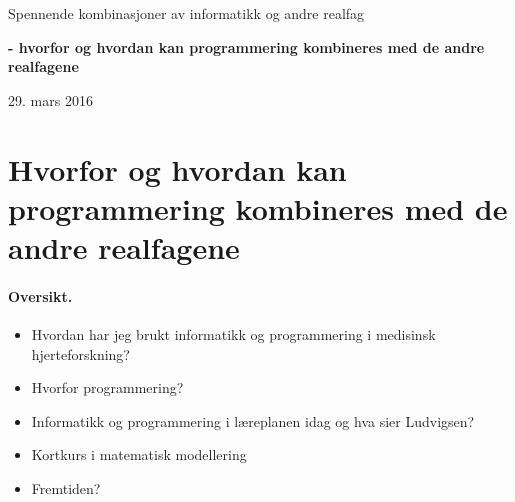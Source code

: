 \documentclass[%
oneside,                 %
final,                   %
10pt,norsk]{article}
\begin{document}






\thispagestyle{empty}

\begin{center}
{\LARGE\bf
\begin{spacing}{1.25}
Spennende kombinasjoner av informatikk og andre realfag
\end{spacing}
}
\end{center}


\begin{center}
{\bf - hvorfor og hvordan kan programmering kombineres med de andre realfagene${}^{}$} \\ [0mm]
\end{center}

\begin{center}
\end{center}
    

\begin{center}
29. mars 2016
\end{center}

\vspace{1cm}



\section*{Hvorfor og hvordan kan programmering kombineres med de andre realfagene}

\paragraph{Oversikt.}
\begin{itemize}
\item Hvordan har jeg brukt informatikk og programmering i medisinsk hjerteforskning?

\item Hvorfor programmering?

\item Informatikk og programmering i læreplanen idag og hva sier Ludvigsen?

\item Kortkurs i matematisk modellering

\item Fremtiden?
\end{itemize}
\end{document}
